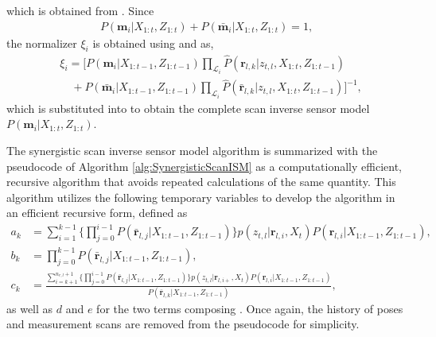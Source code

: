 which is obtained from . Since %
\begin{align*}
P(\mathbf{m}_i|X_{1:t},Z_{1:t})+P(\bar{\mathbf{m}}_i|X_{1:t},Z_{1:t})=1,
\end{align*}
the normalizer $\xi_i$ is obtained using  and  as,
\begin{align}
&\xi_i=
\bigg[
P(\mathbf{m}_i|{X_{1:t-1}},Z_{1:t-1})
\prod_{\mathcal L_i}
\hat P(\mathbf{r}_{l,k}|z_{t,l},{X_{1:t}},Z_{1:t-1})
\nonumber\\&\quad
+
P(\bar{\mathbf{m}}_i|{X_{1:t-1}},Z_{1:t-1})
\prod_{\mathcal L_i}
\hat P(\bar{\mathbf{r}}_{l,k}|z_{t,l},X_{1:t},Z_{1:t-1})
\bigg]^{-1},\label{eqn:xi}
\end{align}
which is substituted into  to obtain the complete scan inverse sensor model $P(\mathbf{m}_i|X_{1:t},Z_{1:t})$. 


The synergistic scan inverse sensor model algorithm is summarized with the pseudocode of Algorithm \ref{alg:SynergisticScanISM} as a computationally efficient, recursive algorithm that avoids repeated calculations of the same quantity. This algorithm utilizes the following temporary variables to develop the algorithm in an efficient recursive form, defined as
\begin{align*}
a_k&=\sum_{i=1}^{k-1}\bigg\{\prod_{j=0}^{i-1}P(\bar{\mathbf{r}}_{l,j}|X_{1:t-1},Z_{1:t-1})\bigg\}p(z_{t,l}|\mathbf{r}_{l,i},X_t)P(\mathbf{r}_{l,i}|X_{1:t-1},Z_{1:t-1}),
\\
b_k&=\prod_{j=0}^{k-1}P(\bar{\mathbf{r}}_{l,j}|X_{1:t-1},Z_{1:t-1}),
\nonumber\\
c_k&=\frac{
\sum_{i=k+1}^{n_{r,l}+1}\bigg\{\prod_{j=0}^{i-1}P(\bar{\mathbf{r}}_{l,j}|X_{1:t-1},Z_{1:t-1})\bigg\}p(z_{t,l}|\mathbf{r}_{l,i+},X_t)P(\mathbf{r}_{l,i}|X_{1:t-1},Z_{1:t-1})}{P(\bar{\mathbf{r}}_{l,k}|X_{1:t-1},Z_{1:t-1})},
\end{align*}
as well as $d$ and $e$ for the two terms composing . Once again, the history of poses and measurement scans are removed from the pseudocode for simplicity.

